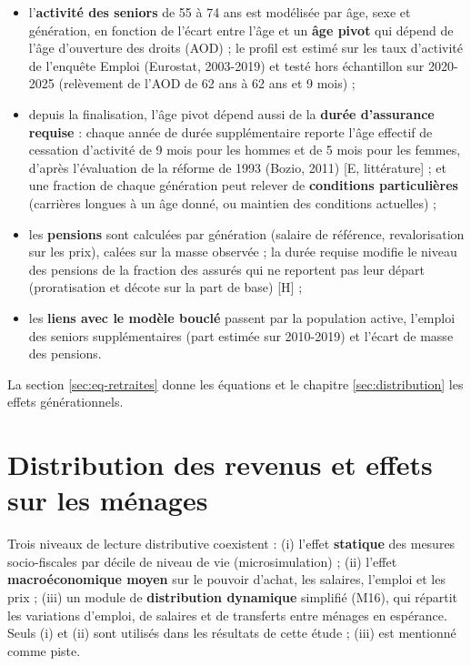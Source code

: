 \documentclass[
  11pt,
  11pt,
  a4paper,
  openany]{book}
\providecommand{\tightlist}{%
  \setlength{\itemsep}{0pt}\setlength{\parskip}{0pt}}
\begin{document}
\begin{itemize}
\tightlist
\item
  l'\textbf{activité des seniors} de 55 à 74 ans est modélisée par âge,
  sexe et génération, en fonction de l'écart entre l'âge et un
  \textbf{âge pivot} qui dépend de l'âge d'ouverture des droits (AOD) ;
  le profil est estimé sur les taux d'activité de l'enquête Emploi
  (Eurostat, 2003-2019) et testé hors échantillon sur 2020-2025
  (relèvement de l'AOD de 62 ans à 62 ans et 9 mois) ;
\item
  depuis la finalisation, l'âge pivot dépend aussi de la \textbf{durée
  d'assurance requise} : chaque année de durée supplémentaire reporte
  l'âge effectif de cessation d'activité de 9 mois pour les hommes et de
  5 mois pour les femmes, d'après l'évaluation de la réforme de 1993
  (Bozio, 2011) {[}E, littérature{]} ; et une fraction de chaque
  génération peut relever de \textbf{conditions particulières}
  (carrières longues à un âge donné, ou maintien des conditions
  actuelles) ;
\item
  les \textbf{pensions} sont calculées par génération (salaire de
  référence, revalorisation sur les prix), calées sur la masse observée
  ; la durée requise modifie le niveau des pensions de la fraction des
  assurés qui ne reportent pas leur départ (proratisation et décote sur
  la part de base) {[}H{]} ;
\item
  les \textbf{liens avec le modèle bouclé} passent par la population
  active, l'emploi des seniors supplémentaires (part estimée sur
  2010-2019) et l'écart de masse des pensions.
\end{itemize}

La section \ref{sec:eq-retraites} donne les équations et le chapitre
\ref{sec:distribution} les effets générationnels.

\hypertarget{sec:distrib-archi}{%
\section{Distribution des revenus et effets sur les
ménages}\label{sec:distrib-archi}}

Trois niveaux de lecture distributive coexistent : (i) l'effet
\textbf{statique} des mesures socio-fiscales par décile de niveau de vie
(microsimulation) ; (ii) l'effet \textbf{macroéconomique moyen} sur le
pouvoir d'achat, les salaires, l'emploi et les prix ; (iii) un module de
\textbf{distribution dynamique} simplifié (M16), qui répartit les
variations d'emploi, de salaires et de transferts entre ménages en
espérance. Seuls (i) et (ii) sont utilisés dans les résultats de cette
étude ; (iii) est mentionné comme piste.
\end{document}
